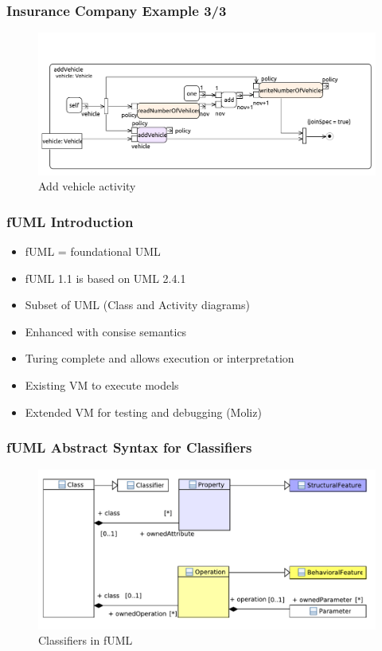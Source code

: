 \documentclass{beamer}
\begin{document}
\begin{frame}
\frametitle{Insurance Company Example 3/3}
\begin{figure}[h!t]
 \centering
 \includegraphics[scale=0.45]{images/insurance_ref/Activity_addVehicle_addVehicle}
 \caption{Add vehicle activity}
 \label{fig:calculatePremium}
\end{figure}
\end{frame}




\begin{frame}
\frametitle{fUML Introduction}
\begin{itemize}
 \item fUML = foundational UML
 \item fUML 1.1 is based on UML 2.4.1
 \item Subset of UML (Class and Activity diagrams)
 \item Enhanced with consise semantics
 \item Turing complete and allows execution or interpretation
 \item Existing VM to execute models
 \item Extended VM for testing and debugging (Moliz) \cite{DBLP:conf/models/MayerhoferLK12}
\end{itemize}
\end{frame}

\begin{frame}
\frametitle{fUML Abstract Syntax for Classifiers}
\begin{figure}[h!t]
 \centering
 \includegraphics[scale=0.5]{images/Model_Model_Classifiers}
 \caption{Classifiers in fUML}
 \label{fig:classifiers}
\end{figure}
\end{frame}
\end{document}
